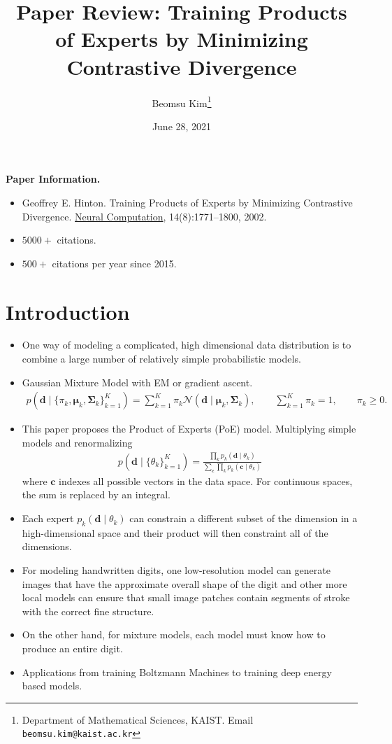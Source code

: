 \documentclass[10pt]{article}
\title{Paper Review: Training Products of Experts by Minimizing Contrastive Divergence}
\author{Beomsu Kim\footnote{Department of Mathematical Sciences, KAIST. Email \texttt{beomsu.kim@kaist.ac.kr}}}
\date{June 28, 2021}
\newcommand{\NN}{\mathcal{N}}
\begin{document}
\maketitle

\textbf{Paper Information.}

\begin{itemize}
\item Geoffrey E. Hinton. Training Products of Experts by Minimizing Contrastive Divergence. \underline{Neural Computation}, 14(8):1771--1800, 2002.
\item $5000+$ citations.
\item $500+$ citations per year since 2015.
\end{itemize}

\section{Introduction}

\begin{itemize}
\item One way of modeling a complicated, high dimensional data distribution is to combine a large number of relatively simple probabilistic models.
\item Gaussian Mixture Model with EM or gradient ascent.
\begin{align*}
p(\mathbf{d} \mid \{\pi_k, \bm{\mu}_k, \mathbf{\Sigma}_k\}_{k = 1}^K) = \sum_{k = 1}^K \pi_k \NN(\mathbf{d} \mid \bm{\mu}_k, \mathbf{\Sigma}_k), \qquad \sum_{k = 1}^K \pi_k = 1, \qquad \pi_k \geq 0.
\end{align*}
\item This paper proposes the Product of Experts (PoE) model. Multiplying simple models and renormalizing
\begin{align*}
p(\mathbf{d} \mid \{\theta_k\}_{k = 1}^K) = \frac{\prod_k p_k(\mathbf{d} \mid \theta_k)}{\sum_\mathbf{c} \prod_k p_k(\mathbf{c} \mid \theta_k)}
\end{align*}
where $\mathbf{c}$ indexes all possible vectors in the data space. For continuous spaces, the sum is replaced by an integral.
\item Each expert $p_k(\mathbf{d} \mid \theta_k)$ can constrain a different subset of the dimension in a high-dimensional space and their product will then constraint all of the dimensions.
\item For modeling handwritten digits, one low-resolution model can generate images that have the approximate overall shape of the digit and other more local models can ensure that small image patches contain segments of stroke with the correct fine structure.
\item On the other hand, for mixture models, each model must know how to produce an entire digit.
\item Applications from training Boltzmann Machines to training deep energy based models.
\end{itemize}
\end{document}
